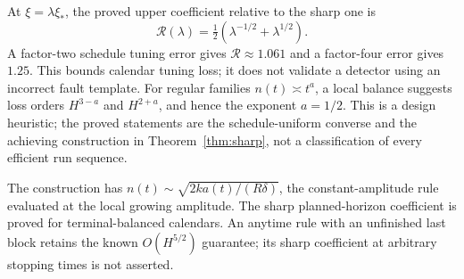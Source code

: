 \begin{remark}
At $\xi=\lambda\xi_*$, the proved upper coefficient relative to the sharp one is
\begin{equation}
 \mathcal R(\lambda)=\tfrac12(\lambda^{-1/2}+\lambda^{1/2}).\label{eq:robust}
\end{equation}
A factor-two schedule tuning error gives $\mathcal R\approx1.061$ and a factor-four error gives $1.25$. This bounds calendar tuning loss; it does not validate a detector using an incorrect fault template. For regular families $n(t)\asymp t^a$, a local balance suggests loss orders $H^{3-a}$ and $H^{2+a}$, and hence the exponent $a=1/2$. This is a design heuristic; the proved statements are the schedule-uniform converse and the achieving construction in Theorem~\ref{thm:sharp}, not a classification of every efficient run sequence.

The construction has $n(t)\sim\sqrt{2k a(t)/(R\delta)}$, the constant-amplitude rule evaluated at the local growing amplitude. The sharp planned-horizon coefficient is proved for terminal-balanced calendars. An anytime rule with an unfinished last block retains the known $O(H^{5/2})$ guarantee; its sharp coefficient at arbitrary stopping times is not asserted.
\end{remark}

